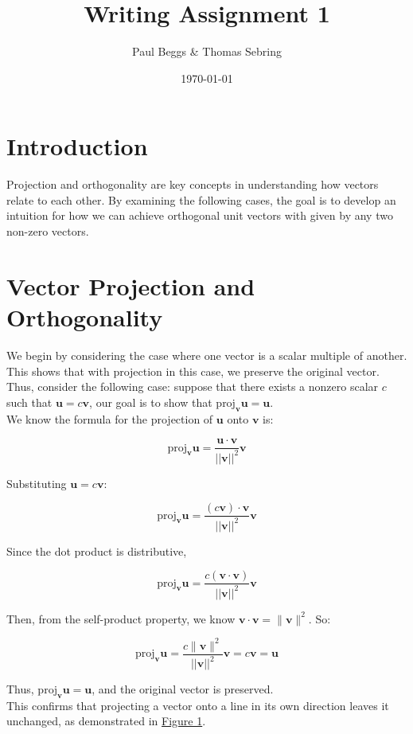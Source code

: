 \documentclass{article}
\title{Writing Assignment 1}
\author{Paul Beggs \& Thomas Sebring}
\date{\today}
\newcommand{\mbf}[1]{\mathbf{#1}}
\begin{document}
\maketitle

\section{Introduction}

Projection and orthogonality are key concepts in understanding how vectors relate to each other. By examining the following cases, the goal is to develop an intuition for how we can achieve orthogonal unit vectors with given by any two non-zero vectors.  

\section{Vector Projection and Orthogonality}

We begin by considering the case where one vector is a scalar multiple of another. This shows that with projection in this case, we preserve the original vector. Thus, consider the following case: suppose that there exists a nonzero scalar \(c\) such that \(\mbf{u} = c \mbf{v}\), our goal is to show that \(\text{proj}_{\mbf{v}} \mbf{u} = \mbf{u}\). \\

We know the formula for the projection of \(\mbf{u}\) onto \(\mbf{v}\) is:

\[
\text{proj}_{\mbf{v}} \mbf{u} = \frac{\mbf{u} \cdot \mbf{v}}{||\mbf{v}||^2} \mbf{v}
\]

Substituting \(\mbf{u} = c \mbf{v}\):

\[
\text{proj}_{\mbf{v}} \mbf{u} = \frac{(c \mbf{v}) \cdot \mbf{v}}{||\mbf{v}||^2} \mbf{v}
\]

Since the dot product is distributive,

\[
\text{proj}_{\mbf{v}} \mbf{u} = \frac{c (\mbf{v} \cdot \mbf{v})}{||\mbf{v}||^2} \mbf{v}
\]

Then, from the self-product property, we know \(\mbf{v} \cdot \mbf{v} = \| \mbf{v} \|^2\). So:

\[
\text{proj}_{\mbf{v}} \mbf{u} = \frac{c \| \mbf{v} \|^2}{||\mbf{v}||^2} \mbf{v} = c \mbf{v} = \mbf{u}
\]

Thus, \(\text{proj}_{\mbf{v}} \mbf{u} = \mbf{u}\), and the original vector is preserved. \\

This confirms that projecting a vector onto a line in its own direction leaves it unchanged, as demonstrated in \hyperref[fig1]{Figure 1}.
\end{document}
